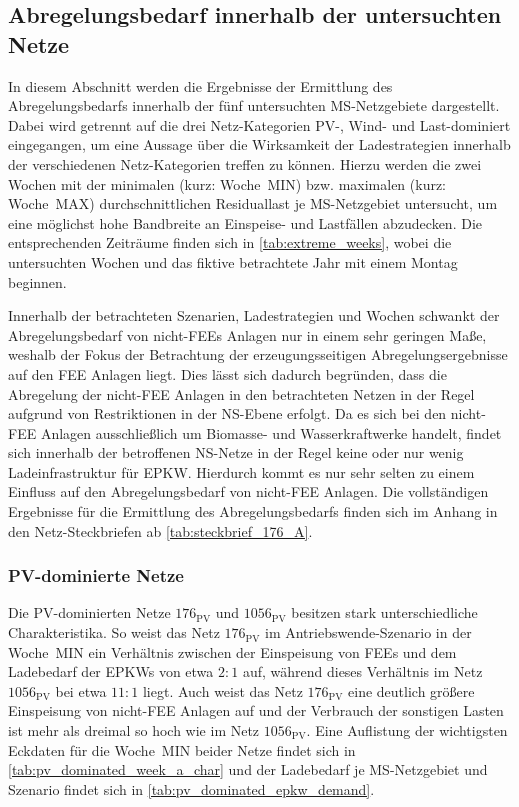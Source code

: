 \subsection{Abregelungsbedarf innerhalb der untersuchten Netze}\label{chap:cur_results}

In diesem Abschnitt werden die Ergebnisse der Ermittlung des Abregelungsbedarfs innerhalb der fünf untersuchten \gls{MS}-Netzgebiete dargestellt.
Dabei wird getrennt auf die drei Netz-Kategorien \gls{PV}-, Wind- und Last-dominiert eingegangen, um eine Aussage über die Wirksamkeit der Ladestrategien innerhalb der verschiedenen Netz-Kategorien treffen zu können.
Hierzu werden die zwei Wochen mit der minimalen (kurz: Woche~MIN) bzw. maximalen (kurz: Woche~MAX) durchschnittlichen Residuallast je \gls{MS}-Netzgebiet untersucht, um eine möglichst hohe Bandbreite an Einspeise- und Lastfällen abzudecken.
Die entsprechenden Zeiträume finden sich in \autoref{tab:extreme_weeks}, wobei die untersuchten Wochen und das fiktive betrachtete Jahr mit einem Montag beginnen.



Innerhalb der betrachteten Szenarien, Ladestrategien und Wochen schwankt der Abregelungsbedarf von nicht-\glspl{FEE} Anlagen nur in einem sehr geringen Maße, weshalb der Fokus der Betrachtung der erzeugungsseitigen Abregelungsergebnisse auf den \gls{FEE} Anlagen liegt.
Dies lässt sich dadurch begründen, dass die Abregelung der nicht-\gls{FEE} Anlagen in den betrachteten Netzen in der Regel aufgrund von Restriktionen in der \gls{NS}-Ebene erfolgt.
Da es sich bei den nicht-\gls{FEE} Anlagen ausschließlich um Biomasse- und Wasserkraftwerke handelt, findet sich innerhalb der betroffenen \gls{NS}-Netze in der Regel keine oder nur wenig Ladeinfrastruktur für \gls{EPKW}.
Hierdurch kommt es nur sehr selten zu einem Einfluss auf den Abregelungsbedarf von nicht-\gls{FEE} Anlagen.
Die vollständigen Ergebnisse für die Ermittlung des Abregelungsbedarfs finden sich im Anhang in den Netz-Steckbriefen ab \autoref{tab:steckbrief_176_A}.


\subsubsection{PV-dominierte Netze}

Die \gls{PV}-dominierten Netze \(176_{\text{PV}}\) und \(1056_{\text{PV}}\) besitzen stark unterschiedliche Charakteristika.
So weist das Netz \(176_{\text{PV}}\) im Antriebswende-Szenario in der Woche~MIN ein Verhältnis zwischen der Einspeisung von \glspl{FEE} und dem Ladebedarf der \glspl{EPKW} von etwa \(2:1\) auf, während dieses Verhältnis im Netz \(1056_{\text{PV}}\) bei etwa \(11:1\) liegt.
Auch weist das Netz \(176_{\text{PV}}\) eine deutlich größere Einspeisung von nicht-\gls{FEE} Anlagen auf und der Verbrauch der sonstigen Lasten ist mehr als dreimal so hoch wie im Netz \(1056_{\text{PV}}\).
Eine Auflistung der wichtigsten Eckdaten für die Woche~MIN beider Netze findet sich in \autoref{tab:pv_dominated_week_a_char} und der Ladebedarf je \gls{MS}-Netzgebiet und Szenario findet sich in \autoref{tab:pv_dominated_epkw_demand}.

